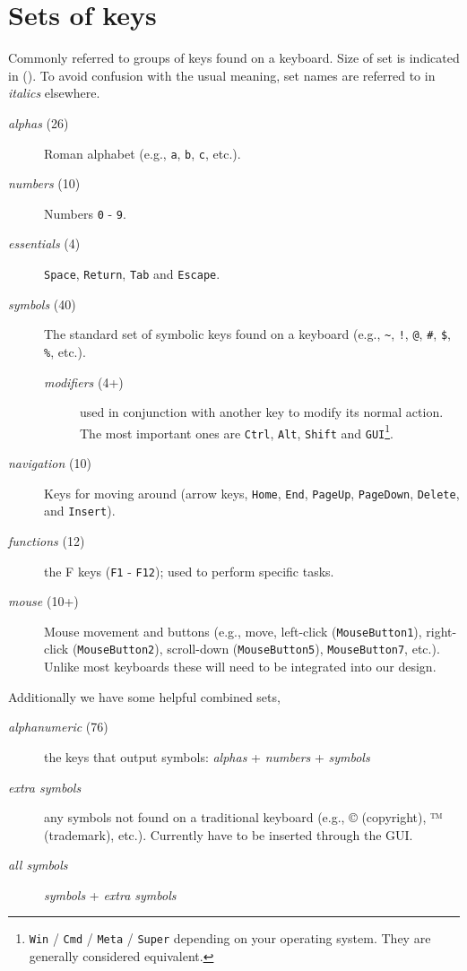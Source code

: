 \documentclass[logo,bsc,singlespacing,parskip]{infthesis}
\begin{document}
\section{Sets of keys}
\label{sec:org6f4a026}
Commonly referred to groups of keys found on a keyboard.
Size of set is indicated in ().
To avoid confusion with the usual meaning, set names are referred to in \emph{italics} elsewhere.

\begin{mdframed}
\begin{description}
\item[{\emph{alphas} (26)}] Roman alphabet (e.g., \texttt{a}, \texttt{b}, \texttt{c}, etc.).
\item[{\emph{numbers} (10)}] Numbers \texttt{0} - \texttt{9}.
\item[{\emph{essentials} (4)}] \texttt{Space}, \texttt{Return}, \texttt{Tab} and \texttt{Escape}.
\item[{\emph{symbols} (40)}] The standard set of symbolic keys found on a keyboard (e.g.,  \texttt{\textasciitilde{}}, \texttt{!}, \texttt{@}, \texttt{\#}, \texttt{\$}, \texttt{\%}, etc.).
\begin{description}
\item[{\emph{modifiers} (4+)}] used in conjunction with another key to modify its normal action. The most important ones are \texttt{Ctrl}, \texttt{Alt}, \texttt{Shift} and \texttt{GUI}\footnote{\texttt{Win} / \texttt{Cmd} / \texttt{Meta} / \texttt{Super} depending on your operating system. They are generally considered equivalent.}.
\end{description}
\item[{\emph{navigation} (10)}] Keys for moving around (arrow keys, \texttt{Home}, \texttt{End}, \texttt{PageUp}, \texttt{PageDown}, \texttt{Delete}, and \texttt{Insert}).
\item[{\emph{functions} (12)}] the F keys (\texttt{F1} - \texttt{F12}); used to perform specific tasks.
\item[{\emph{mouse} (10+)}] Mouse movement and buttons (e.g., move, left-click (\texttt{MouseButton1}), right-click (\texttt{MouseButton2}), scroll-down (\texttt{MouseButton5}), \texttt{MouseButton7}, etc.).
Unlike most keyboards these will need to be integrated into our design.
\end{description}
Additionally we have some helpful combined sets,
\begin{description}
\item[{\emph{alphanumeric} (76)}] the keys that output symbols: \emph{alphas} + \emph{numbers} + \emph{symbols}
\item[{\emph{extra symbols} }] any symbols not found on a traditional keyboard (e.g., © (copyright), ™ (trademark), etc.).
Currently have to be inserted through the GUI.
\item[{\emph{all symbols}}] \emph{symbols} + \emph{extra symbols}
\end{description}
\end{mdframed}
\end{document}
